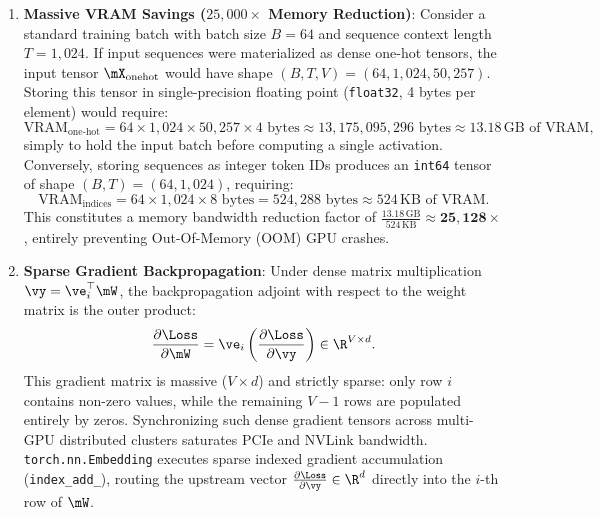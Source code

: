 \documentclass[../../main.tex]{subfiles}
\begin{document}
\begin{enumerate}
    \item \textbf{Massive VRAM Savings ($25{,}000\times$ Memory Reduction)}:
    Consider a standard training batch with batch size $B = 64$ and sequence context length $T = 1{,}024$. If input sequences were materialized as dense one-hot tensors, the input tensor $\mX_{\text{onehot}}$ would have shape $(B, T, V) = (64, 1{,}024, 50{,}257)$. Storing this tensor in single-precision floating point (\texttt{float32}, 4 bytes per element) would require:
    \begin{equation}
    \label{eq:vram_blowout}
    \text{VRAM}_{\text{one-hot}} = 64 \times 1{,}024 \times 50{,}257 \times 4 \text{ bytes} \approx 13{,}175{,}095{,}296 \text{ bytes} \approx 13.18\,\text{GB of VRAM},
    \end{equation}
    simply to hold the input batch before computing a single activation.
    Conversely, storing sequences as integer token IDs produces an \texttt{int64} tensor of shape $(B, T) = (64, 1{,}024)$, requiring:
    \begin{equation}
    \label{eq:vram_compact}
    \text{VRAM}_{\text{indices}} = 64 \times 1{,}024 \times 8 \text{ bytes} = 524{,}288 \text{ bytes} \approx 524\,\text{KB of VRAM}.
    \end{equation}
    This constitutes a memory bandwidth reduction factor of $\frac{13.18\,\text{GB}}{524\,\text{KB}} \approx \mathbf{25{,}128\times}$, entirely preventing Out-Of-Memory (OOM) GPU crashes.

    \item \textbf{Sparse Gradient Backpropagation}:
    Under dense matrix multiplication $\vy = \ve_i^\top \mW$, the backpropagation adjoint with respect to the weight matrix is the outer product:
    \begin{equation}
    \label{eq:gradient_outer_product}
    \frac{\partial \Loss}{\partial \mW} = \ve_i \left( \frac{\partial \Loss}{\partial \vy} \right) \in \R^{V \times d}.
    \end{equation}
    This gradient matrix is massive ($V \times d$) and strictly sparse: only row $i$ contains non-zero values, while the remaining $V-1$ rows are populated entirely by zeros. Synchronizing such dense gradient tensors across multi-GPU distributed clusters saturates PCIe and NVLink bandwidth. \texttt{torch.nn.Embedding} executes sparse indexed gradient accumulation (\texttt{index\_add\_}), routing the upstream vector $\frac{\partial \Loss}{\partial \vy} \in \R^d$ directly into the $i$-th row of $\mW$.
\end{enumerate}
\end{document}
